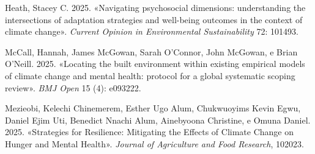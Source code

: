 \documentclass[
  italian,
]{article}
\newlength{\cslhangindent}
\newenvironment{CSLReferences}[2] %
 {\begin{list}{}{%
  \setlength{\itemindent}{0pt}
  \setlength{\leftmargin}{0pt}
  \setlength{\parsep}{0pt}
  \ifodd #1
   \setlength{\leftmargin}{\cslhangindent}
   \setlength{\itemindent}{-1\cslhangindent}
  \fi
  \setlength{\itemsep}{#2\baselineskip}}}
 {\end{list}}
\begin{document}
\protect{}\label{refs}
\begin{CSLReferences}{1}{0}
Heath, Stacey C. 2025. {«Navigating psychosocial dimensions:
understanding the intersections of adaptation strategies and well-being
outcomes in the context of climate change»}. \emph{Current Opinion in
Environmental Sustainability} 72: 101493.

McCall, Hannah, James McGowan, Sarah O'Connor, John McGowan, e Brian
O'Neill. 2025. {«Locating the built environment within existing
empirical models of climate change and mental health: protocol for a
global systematic scoping review»}. \emph{BMJ Open} 15 (4): e093222.

Mezieobi, Kelechi Chinemerem, Esther Ugo Alum, Chukwuoyims Kevin Egwu,
Daniel Ejim Uti, Benedict Nnachi Alum, Ainebyoona Christine, e Omuna
Daniel. 2025. {«Strategies for Resilience: Mitigating the Effects of
Climate Change on Hunger and Mental Health»}. \emph{Journal of
Agriculture and Food Research}, 102023.

\end{CSLReferences}
\end{document}

